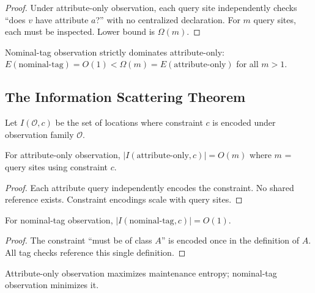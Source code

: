 \begin{proof}
Under attribute-only observation, each query site independently checks ``does $v$ have attribute $a$?'' with no centralized declaration. For $m$ query sites, each must be inspected. Lower bound is $\Omega(m)$.
\end{proof}

\begin{corollary}\label{cor:strict-dominance}
Nominal-tag observation strictly dominates attribute-only: $E(\text{nominal-tag}) = O(1) < \Omega(m) = E(\text{attribute-only})$ for all $m > 1$.
\end{corollary}

\subsection{The Information Scattering Theorem}\label{the-information-scattering-theorem}

\begin{definition}
Let $I(\mathcal{O}, c)$ be the set of locations where constraint $c$ is encoded under observation family $\mathcal{O}$.
\end{definition}

\begin{theorem}\label{thm:attribute-scattering}
For attribute-only observation, $|I(\text{attribute-only}, c)| = O(m)$ where $m$ = query sites using constraint $c$.
\end{theorem}

\begin{proof}
Each attribute query independently encodes the constraint. No shared reference exists. Constraint encodings scale with query sites.
\end{proof}

\begin{theorem}\label{thm:nominal-centralization}
For nominal-tag observation, $|I(\text{nominal-tag}, c)| = O(1)$.
\end{theorem}

\begin{proof}
The constraint ``must be of class $A$'' is encoded once in the definition of $A$. All tag checks reference this single definition.
\end{proof}

\begin{corollary}\label{cor:maintenance-entropy}
Attribute-only observation maximizes maintenance entropy; nominal-tag observation minimizes it.
\end{corollary}
